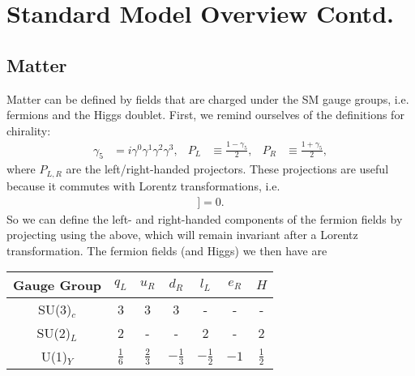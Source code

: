\documentclass[a4paper, 11pt, normalem]{report}
\begin{document}
\chapter{Standard Model Overview Contd.}
\section{Matter}
Matter can be defined by fields that are charged under the SM gauge groups, i.e. fermions and the Higgs doublet.
First, we remind ourselves of the definitions for chirality:
\begin{align}
    \gamma_5 &= i\gamma^0\gamma^1\gamma^2\gamma^3, & P_L &\equiv\frac{1-\gamma_5}{2}, & P_R &\equiv \frac{1+\gamma_5}{2},
\end{align}
where $P_{L,R}$ are the left/right-handed projectors.
These projections are useful because it commutes with Lorentz transformations, i.e.
\begin{align}
    [\gamma_5,[\gamma_\mu,\gamma_\nu]] = 0.
\end{align}
So we can define the left- and right-handed components of the fermion fields by projecting using the above, which will remain invariant after a Lorentz transformation.
The fermion fields (and Higgs) we then have are
\begin{table}[H]
    \centering
    \begin{tabular}{c|c|c|c|c|c|c}
        \hline\hline
        Gauge Group & $q_L$ & $u_R$ & $d_R$ & $l_L$ & $e_R$ & $H$ \\
        \hline\hline
        SU(3)$_c$ & 3 & 3 & 3 & - & - & - \\
        SU(2)$_L$ & 2 & - & - & 2 & - & 2 \\
        U(1)$_Y$  & $\frac16$ & $\frac23$ & $-\frac13$ & $-\frac12$ & $-1$ & $\frac12$\\
        \hline\hline
    \end{tabular}
\end{table}
\end{document}
